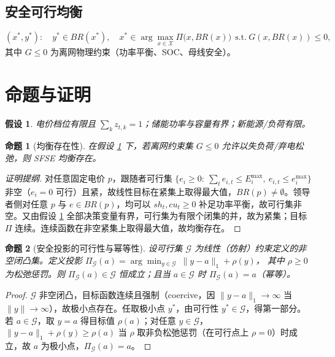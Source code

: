\documentclass[UTF8,a4paper,11pt]{ctexart}
\newtheorem{proposition}{命题}
\newtheorem{assumption}{假设}
\theoremstyle{remark}
\begin{document}
\subsection{安全可行均衡}
\begin{equation}
(x^*,y^*):\quad y^*\in BR(x^*),\quad x^*\in\arg\max_{x\in\mathcal{X}} \Pi\big(x,BR(x)\big)\ \ \text{s.t.}\ G(x,BR(x))\le0,
\end{equation}
其中 $G\le0$ 为离网物理约束（功率平衡、SOC、母线安全）。

\section{命题与证明}

\begin{assumption}\label{as:compact}
电价档位有限且 $\sum_k z_{t,k}=1$；储能功率与容量有界；新能源/负荷有限。
\end{assumption}

\begin{proposition}[均衡存在性]\label{prop:exist}
在假设 \ref{as:compact} 下，若离网约束集 $G\le0$ 允许以失负荷/弃电松弛，则 SFSE 均衡存在。
\end{proposition}

\begin{proof}[证明提纲]
对任意固定电价 $p$，跟随者可行集 $\{e_i\ge0:\ \sum_t e_{i,t}\le E_i^{\max},\ e_{i,t}\le e_i^{\max}\}$ 非空（$e_i=0$ 可行）且紧，故线性目标在紧集上取得最大值，$BR(p)\neq\emptyset$。领导者侧对任意 $p$ 与 $e\in BR(p)$，均可以 $sh_t,cu_t\ge0$ 补足功率平衡，故可行集非空。又由假设 \ref{as:compact} 全部决策变量有界，可行集为有限个闭集的并，故为紧集；目标 $\Pi$ 连续。连续函数在非空紧集上取得最大值，故均衡存在。\end{proof}

\begin{proposition}[安全投影的可行性与幂等性]\label{prop:safe}
设可行集 $\mathcal{G}$ 为线性（仿射）约束定义的非空闭凸集。定义投影
$\Pi_{\mathcal{G}}(a)=\arg\min_{y\in\mathcal{G}}\ \|y-a\|_1+\rho(y)$，
其中 $\rho\ge0$ 为松弛惩罚。则 $\Pi_{\mathcal{G}}(a)\in\mathcal{G}$ 恒成立；且当 $a\in\mathcal{G}$ 时 $\Pi_{\mathcal{G}}(a)=a$（幂等）。
\end{proposition}

\begin{proof}
$\mathcal{G}$ 非空闭凸，目标函数连续且强制（coercive，因 $\|y-a\|_1\to\infty$ 当 $\|y\|\to\infty$），故极小点存在。任取极小点 $y^*$，由可行性 $y^*\in\mathcal{G}$，得第一部分。若 $a\in\mathcal{G}$，取 $y=a$ 得目标值 $\rho(a)$；对任意 $y\in\mathcal{G}$，$\|y-a\|_1+\rho(y)\ge\rho(a)$ 当 $\rho$ 取非负松弛惩罚（在可行点上 $\rho=0$）时成立，故 $a$ 为极小点，$\Pi_{\mathcal{G}}(a)=a$。
\end{proof}
\end{document}
